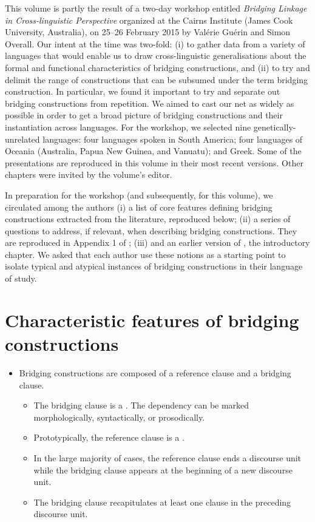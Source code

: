 \begin{refsection}


This volume is partly the result of a two-day workshop entitled \textit{Bridging Linkage in Cross-linguistic Perspective} organized at the Cairns Institute (James Cook University, Australia), on 25--26 February 2015 by Valérie Guérin and Simon Overall. Our intent at the time was two-fold: (i) to gather data from a variety of languages that would enable us to draw cross-linguistic generalisations about the formal and functional characteristics of bridging constructions, and (ii) to try and delimit the range of constructions that can be subsumed under the term bridging construction. In particular, we found it important to try and separate out bridging constructions from repetition. We aimed to cast our net as widely as possible in order to get a broad picture of bridging constructions and their instantiation across languages. For the workshop, we selected  nine genetically-unrelated languages: four languages spoken in South America; four languages of Oceania (Australia, Papua New Guinea, and Vanuatu); and Greek. Some of the presentations are reproduced in this volume in their most recent versions. Other chapters were invited by the volume’s editor. 

In preparation for the workshop (and subsequently, for this volume), we circulated among the authors (i) a list of core features defining bridging constructions extracted from the literature, reproduced below; (ii) a series of questions to address, if relevant, when describing bridging constructions. They are reproduced in Appendix 1 of ; (iii) and an earlier version of , the introductory chapter. We asked that each author use these notions as a starting point to isolate typical and atypical instances of bridging constructions in their language of study. 



\section*{Characteristic features of bridging constructions}


\begin{itemize}
\item Bridging constructions are composed of a reference clause and a bridging clause. 
   \begin{itemize}
   \item The bridging clause is a . The dependency can be marked morphologically, syntactically, or prosodically.
   \item  Prototypically, the reference clause is a . 
   \item In the large majority of cases, the reference clause ends a discourse unit while the bridging clause appears at the beginning of a new discourse unit.
   \item  The bridging clause recapitulates at least one clause in the preceding discourse unit. 
   \end{itemize}
   \end{itemize}
   

\end{refsection}
